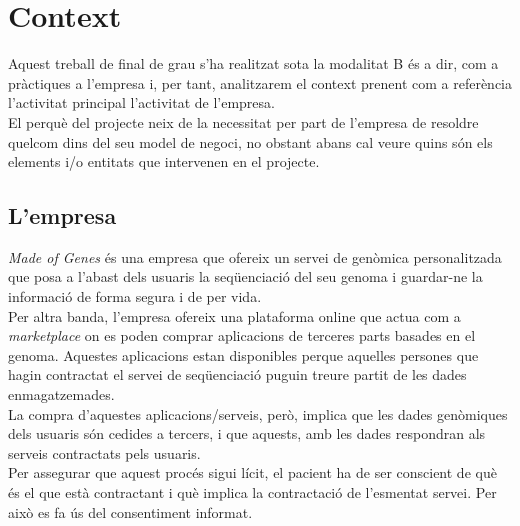 \section{Context}
Aquest treball de final de grau s'ha realitzat sota la modalitat B és a dir, com a pràctiques a l'empresa i, per tant, analitzarem el context prenent com a referència l'activitat principal l'activitat de l'empresa.\\
\newline El perquè del projecte neix de la necessitat per part de l'empresa de resoldre quelcom dins del seu model de negoci, no obstant abans cal veure quins són els elements i/o entitats que intervenen en el projecte.

\subsection{L'empresa}
\textit{Made of Genes} és una empresa que ofereix un servei de genòmica personalitzada que posa a l'abast dels usuaris la seqüenciació del seu genoma i guardar-ne la informació de forma segura i de per vida.\\
\newline Per altra banda, l'empresa ofereix una plataforma online que actua com a \textit{marketplace} on es poden comprar aplicacions de terceres parts basades en el genoma.
Aquestes aplicacions estan disponibles perque aquelles persones que hagin contractat el servei de seqüenciació puguin treure partit de les dades enmagatzemades.\\
\newline La compra d'aquestes aplicacions/serveis, però, implica que les dades genòmiques dels usuaris són cedides a  tercers, i que aquests, amb les dades respondran als serveis contractats pels usuaris.\\
\newline Per assegurar que aquest procés sigui lícit, el pacient ha de ser conscient de què és el que està contractant i què implica la contractació de l'esmentat servei. Per això es fa ús del consentiment informat.

